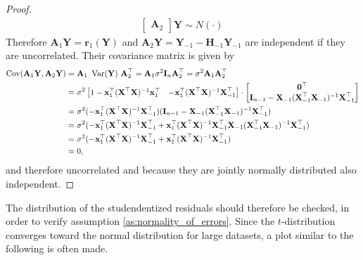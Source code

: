 \begin{proof}
\begin{align*}
\begin{bmatrix}
            \textbf{A}_2
        \end{bmatrix}
        \textbf{Y}
        \sim N(\cdot)
              \
    \end{align*}
    Therefore $\textbf{A}_1 \textbf{Y} = \textbf{r}_1(\textbf{Y})$ and $\textbf{A}_2 \textbf{Y} = \textbf{Y}_{-1} - \textbf{H}_{-1} \textbf{Y}_{-1}$ are independent if they are uncorrelated. Their covariance matrix is given by 
    \begin{align*}
        \operatorname{\text{Cov}}(\textbf{A}_1 \textbf{Y}, \mathbf{A}_2 \textbf{Y}) &= \textbf{A}_1\  \operatorname{\text{Var}}(\textbf{Y}) \ \textbf{A}_2^\top = \textbf{A}_1 \sigma^2 \textbf{I}_n \textbf{A}_2^\top = \sigma^2 \textbf{A}_1 \mathbf{A}_2^\top \\
        &= \sigma^2 
        \begin{bmatrix}
            1 - \textbf{x}_1^\top (\textbf{X}^\top \textbf{X})^{-1} \textbf{x}_1^\top & - \textbf{x}_1^\top (\textbf{X}^\top \textbf{X})^{-1} \textbf{X}_{-1}^\top
        \end{bmatrix}
        \cdot
        \begin{bmatrix}
            \textbf{0}^\top \\
            \textbf{I}_{n-1} - \textbf{X}_{-1} (\textbf{X}_{-1}^\top \textbf{X}_{-1})^{-1} \textbf{X}_{-1}^\top
        \end{bmatrix} \\
        &= \sigma^2 (- \textbf{x}_1^\top (\textbf{X}^\top \textbf{X})^{-1} \textbf{X}_{-1}^\top) (\textbf{I}_{n-1} - \textbf{X}_{-1} (\textbf{X}_{-1}^\top \textbf{X}_{-1})^{-1} \textbf{X}_{-1}^\top) \\
        &= \sigma^2 (- \textbf{x}_1^\top (\textbf{X}^\top \textbf{X})^{-1} \textbf{X}_{-1}^\top + \textbf{x}_1^\top (\textbf{X}^\top \textbf{X})^{-1} \textbf{X}_{-1}^\top \textbf{X}_{-1} (\textbf{X}_{-1}^\top \textbf{X}_{-1})^{-1} \textbf{X}_{-1}^\top) \\
        &= \sigma^2 (- \textbf{x}_1^\top (\textbf{X}^\top \textbf{X})^{-1} \textbf{X}_{-1}^\top + \textbf{x}_1^\top (\textbf{X}^\top \textbf{X})^{-1} \textbf{X}_{-1}^\top) \\
        &= 0,
    \end{align*}
    and therefore uncorrelated and because they are jointly normally distributed also independent.
\end{proof}

The distribution of the studendentized residuals should therefore be checked, in order to verify assumption \ref{as:normality_of_errors}. 
Since the $t$-distribution converges toward the normal distribution for large datasets, a plot similar to the following is often made.


